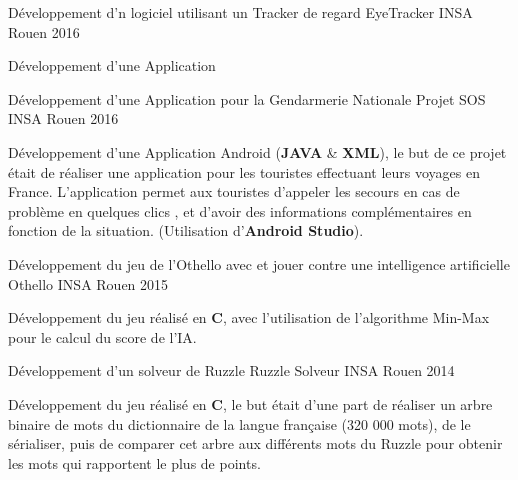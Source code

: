 

\begin{cventries}

  \cventry
	{Développement d'n logiciel utilisant un Tracker de regard} %
	{EyeTracker} %
	{INSA Rouen} %
	{2016} %
	{
		\begin{cvitems} %
			\item {Développement d'une Application}
		\end{cvitems}
	}

  \cventry
	{Développement d'une Application pour la Gendarmerie Nationale} %
	{Projet SOS} %
	{INSA Rouen} %
	{2016} %
	{
		\begin{cvitems} %
			\item {Développement d'une Application Android (\textbf{JAVA} \& \textbf{XML}), le but de ce projet était de réaliser une application pour les touristes effectuant leurs voyages en France. L'application permet aux touristes d'appeler les secours en cas de problème en quelques clics , et d'avoir des informations complémentaires en fonction de la situation. (Utilisation d'\textbf{Android Studio}). }
		\end{cvitems}
	}

  \cventry
	{Développement du jeu de l'Othello avec et jouer contre une intelligence artificielle} %
	{Othello} %
	{INSA Rouen} %
	{2015} %
	{
		\begin{cvitems} %
			\item {Développement du jeu réalisé en \textbf{C}, avec l'utilisation de l'algorithme Min-Max pour le calcul du score de l'IA.}
		\end{cvitems}
	}

  \cventry
	{Développement d'un solveur de Ruzzle} %
	{Ruzzle Solveur} %
	{INSA Rouen} %
	{2014} %
	{
		\begin{cvitems} %
			\item {Développement du jeu réalisé en \textbf{C}, le but était d'une part de réaliser un arbre binaire de mots du dictionnaire de la langue française (320 000 mots), de le sérialiser, puis de comparer cet arbre aux différents mots du Ruzzle pour obtenir les mots qui rapportent le plus de points.}
		\end{cvitems}
	}

\end{cventries}
